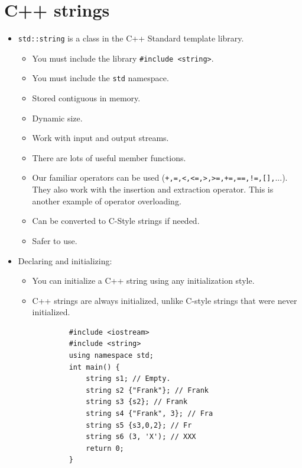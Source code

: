 \section{C++ strings}
\begin{itemize}
    \item \texttt{std::string} is a class in the C++ Standard template library.
        \begin{itemize}
            \item You must include the library \texttt{#include <string>}.
            \item You must include the \texttt{std} namespace.
            \item Stored contiguous in memory.
            \item Dynamic size.
            \item Work with input and output streams.
            \item There are lots of useful member functions.
            \item Our familiar operators can be used (\texttt{+,=,<,<=,>,>=,+=,==,!=,[],}...). They also work with the insertion and extraction operator. This is another example of operator overloading.
            \item Can be converted to C-Style strings if needed.
            \item Safer to use.
        \end{itemize}
    
    \item Declaring and initializing:
        \begin{itemize}
            \item You can initialize a C++ string using any initialization style. 
            \item C++ strings are always initialized, unlike C-style strings that were never initialized.
        \end{itemize}
        \begin{verbatim}
            #include <iostream>
            #include <string>
            using namespace std;
            int main() {
                string s1; // Empty.
                string s2 {"Frank"}; // Frank
                string s3 {s2}; // Frank
                string s4 {"Frank", 3}; // Fra
                string s5 {s3,0,2}; // Fr
                string s6 (3, 'X'); // XXX
                return 0;
            }
        \end{verbatim}
    

\end{itemize}
